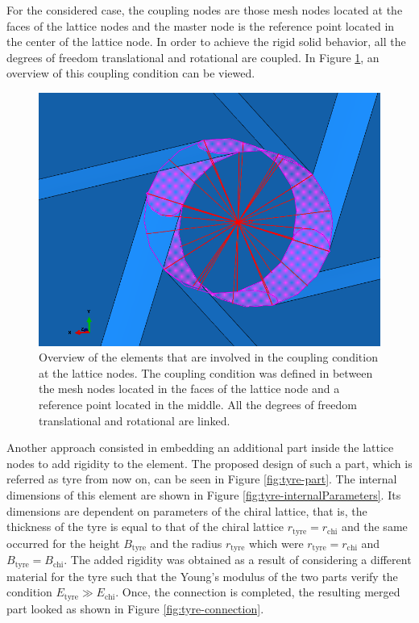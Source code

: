     For the considered case, the coupling nodes are those mesh nodes located at the faces of the lattice nodes and the master node is the reference point located in the center of the lattice node. In order to achieve the rigid solid behavior, all the degrees of freedom translational and rotational are coupled. In Figure \ref{fig:couplingThroughRF}, an overview of this coupling condition can be viewed.

    \begin{figure}[!htpb]
      \centering
      \includegraphics[width=0.6 \textwidth]{figures/model/couplingThroughRF}
      \caption[Overview of the elements that are involved in the coupling condition at the lattice nodes]{Overview of the elements that are involved in the coupling condition at the lattice nodes. The coupling condition was defined in between the mesh nodes located in the faces of the lattice node and a reference point located in the middle. All the degrees of freedom translational and rotational are linked.}\label{fig:couplingThroughRF}
    \end{figure}

    \clearpage
    Another approach consisted in embedding an additional part inside the lattice nodes to add rigidity to the element. The proposed design of such a part, which is referred as tyre from now on, can be seen in Figure \ref{fig:tyre-part}. The internal dimensions of this element are shown in Figure \ref{fig:tyre-internalParameters}. Its dimensions are dependent on parameters of the chiral lattice, that is, the thickness of the tyre is equal to that of the chiral lattice $r_{\mathrm{tyre}} = r_{\mathrm{chi}}$ and the same occurred for the height $B_{\mathrm{tyre}}$ and the radius $r_{\mathrm{tyre}}$ which were $r_{\mathrm{tyre}} = r_{\mathrm{chi}}$ and $B_{\mathrm{tyre}} = B_{\mathrm{chi}}$. The added rigidity was obtained as a result of considering a different material for the tyre such that the Young's modulus of the two parts verify the condition $E_{\mathrm{tyre}} \gg E_{\mathrm{chi}}$. Once, the connection is completed, the resulting merged part looked as shown in Figure \ref{fig:tyre-connection}.

